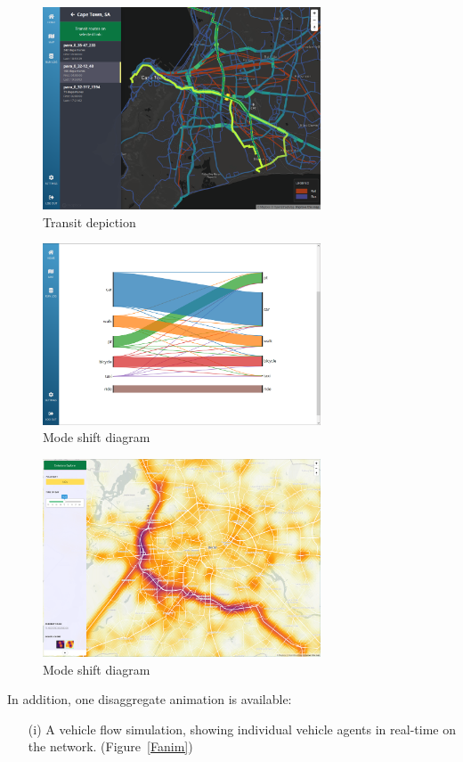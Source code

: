 \documentclass[Afour,sagev,times]{sagej}
\begin{document}
\begin{figure}
\centering
\includegraphics[width=3.25in]{fig-transit.png}
\caption{Transit depiction}\label{Ftransit}
\end{figure}

\begin{figure}
\centering
\includegraphics[width=3.25in]{fig-sankey.png}
\caption{Mode shift diagram}\label{Fsankey}
\end{figure}

\begin{figure}
\centering
\includegraphics[width=3.25in]{fig-emissions.png}
\caption{Mode shift diagram}\label{Femissions}
\end{figure}

In addition, one disaggregate animation is available:

\begin{enumerate}
\item[(i)] A vehicle flow simulation, showing individual vehicle agents in real-time on the network. (Figure~\ref{Fanim})
\end{enumerate}
\end{document}
